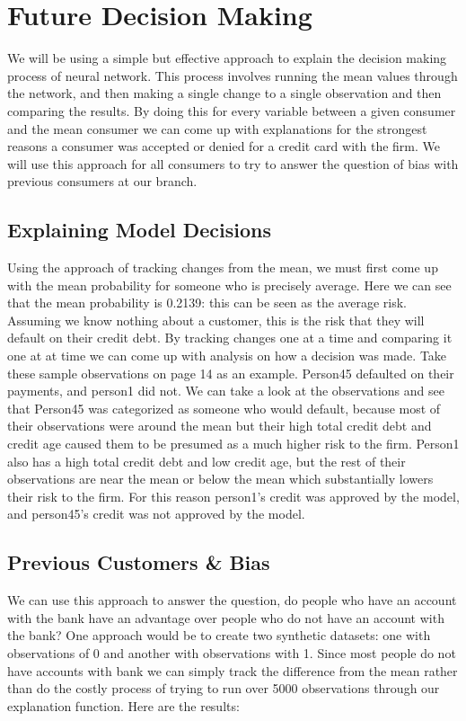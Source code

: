 \documentclass[12pt]{article}
\begin{document}
	
	\section{Future Decision Making}
	
	We will be using a simple but effective approach to explain the decision making process of neural network. This process involves running the mean values through the network, and then making a single change to a single observation and then comparing the results. By doing this for every variable between a given consumer and the mean consumer we can come up with explanations for the strongest reasons a consumer was accepted or denied for a credit card with the firm. We will use this approach for all consumers to try to answer the question of bias with previous consumers at our branch. 
	

	\subsection{Explaining Model Decisions}
	Using the approach of tracking changes from the mean, we must first come up with the mean probability for someone who is precisely average. Here we can see that the mean probability is 0.2139: this can be seen as the average risk. Assuming we know nothing about a customer, this is the risk that they will default on their credit debt. By tracking changes one at a time and comparing it one at at time we can come up with analysis on how a decision was made. Take these sample observations on page 14 as an example.
	 Person45 defaulted on their payments, and person1 did not. We can take a look at the observations and see that Person45 was categorized as someone who would default, because most of their observations were around the mean but their high total credit debt and credit age caused them to be presumed as a much higher risk to the firm. 
	 Person1 also has a high total credit debt and low credit age, but the rest of their observations are near the mean or below the mean which substantially lowers their risk to the firm. For this reason person1's credit was approved by the model, and person45's credit was not approved by the model. 
	
	
	
	\subsection{Previous Customers \& Bias}
	
	We can use this approach to answer the question, do people who have an account with the bank have an advantage over people who do not have an account with the bank? One approach would be to create two synthetic datasets: one with observations of 0 and another with observations with 1. Since most people do not have accounts with bank we can simply track the difference from the mean rather than do the costly process of trying to run over 5000 observations through our explanation function. Here are the results: 
	
\end{document}
